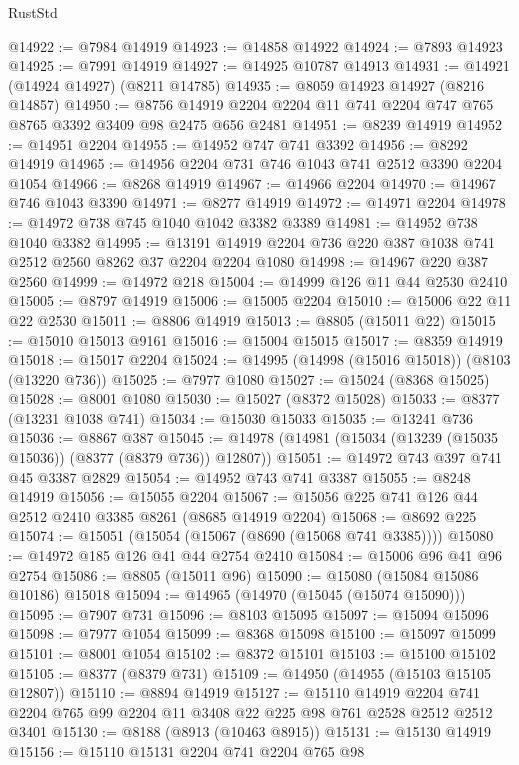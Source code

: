 \begin{lexlean}{RustStd}
\begin{coremodule}
{\begin{coremodule}
{{{{{{{{{{{{{{{{{{{{{{{{{{{{{{{{{{{{{{{{{{{{{{{{{{@14922 := @7984 @14919
@14923 := @14858 @14922
@14924 := @7893 @14923
@14925 := @7991 @14919
@14927 := @14925 @10787 @14913
@14931 := @14921 (@14924 @14927) (@8211 @14785)
@14935 := @8059 @14923 @14927 (@8216 @14857)
@14950 := @8756 @14919 @2204 @2204 @11 @741 @2204 @747 @765 @8765 @3392 @3409 @98 @2475 @656 @2481
@14951 := @8239 @14919
@14952 := @14951 @2204
@14955 := @14952 @747 @741 @3392
@14956 := @8292 @14919
@14965 := @14956 @2204 @731 @746 @1043 @741 @2512 @3390 @2204 @1054
@14966 := @8268 @14919
@14967 := @14966 @2204
@14970 := @14967 @746 @1043 @3390
@14971 := @8277 @14919
@14972 := @14971 @2204
@14978 := @14972 @738 @745 @1040 @1042 @3382 @3389
@14981 := @14952 @738 @1040 @3382
@14995 := @13191 @14919 @2204 @736 @220 @387 @1038 @741 @2512 @2560 @8262 @37 @2204 @2204 @1080
@14998 := @14967 @220 @387 @2560
@14999 := @14972 @218
@15004 := @14999 @126 @11 @44 @2530 @2410
@15005 := @8797 @14919
@15006 := @15005 @2204
@15010 := @15006 @22 @11 @22 @2530
@15011 := @8806 @14919
@15013 := @8805 (@15011 @22)
@15015 := @15010 @15013 @9161
@15016 := @15004 @15015
@15017 := @8359 @14919
@15018 := @15017 @2204
@15024 := @14995 (@14998 (@15016 @15018)) (@8103 (@13220 @736))
@15025 := @7977 @1080
@15027 := @15024 (@8368 @15025)
@15028 := @8001 @1080
@15030 := @15027 (@8372 @15028)
@15033 := @8377 (@13231 @1038 @741)
@15034 := @15030 @15033
@15035 := @13241 @736
@15036 := @8867 @387
@15045 := @14978 (@14981 (@15034 (@13239 (@15035 @15036)) (@8377 (@8379 @736)) @12807))
@15051 := @14972 @743 @397 @741 @45 @3387 @2829
@15054 := @14952 @743 @741 @3387
@15055 := @8248 @14919
@15056 := @15055 @2204
@15067 := @15056 @225 @741 @126 @44 @2512 @2410 @3385 @8261 (@8685 @14919 @2204)
@15068 := @8692 @225
@15074 := @15051 (@15054 (@15067 (@8690 (@15068 @741 @3385))))
@15080 := @14972 @185 @126 @41 @44 @2754 @2410
@15084 := @15006 @96 @41 @96 @2754
@15086 := @8805 (@15011 @96)
@15090 := @15080 (@15084 @15086 @10186) @15018
@15094 := @14965 (@14970 (@15045 (@15074 @15090)))
@15095 := @7907 @731
@15096 := @8103 @15095
@15097 := @15094 @15096
@15098 := @7977 @1054
@15099 := @8368 @15098
@15100 := @15097 @15099
@15101 := @8001 @1054
@15102 := @8372 @15101
@15103 := @15100 @15102
@15105 := @8377 (@8379 @731)
@15109 := @14950 (@14955 (@15103 @15105 @12807))
@15110 := @8894 @14919
@15127 := @15110
    @14919
    @2204
    @741
    @2204
    @765
    @99
    @2204
    @11
    @3408
    @22
    @225
    @98
    @761
    @2528
    @2512
    @2512
    @3401
@15130 := @8188 (@8913 (@10463 @8915))
@15131 := @15130 @14919
@15156 := @15110
    @15131
    @2204
    @741
    @2204
    @765
    @98
}}}}}}}}}}}}}}}}}}}}}}}}}}}}}}}}}}}}}}}}}}}}}}}}}}
\end{coremodule}}
\end{coremodule}
\end{lexlean}
